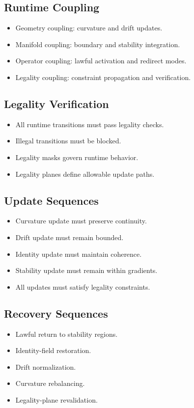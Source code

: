 \subsection{Runtime Coupling}
\begin{itemize}
    \item Geometry coupling: curvature and drift updates.
    \item Manifold coupling: boundary and stability integration.
    \item Operator coupling: lawful activation and redirect modes.
    \item Legality coupling: constraint propagation and verification.
\end{itemize}

\subsection{Legality Verification}
\begin{itemize}
    \item All runtime transitions must pass legality checks.
    \item Illegal transitions must be blocked.
    \item Legality masks govern runtime behavior.
    \item Legality planes define allowable update paths.
\end{itemize}

\subsection{Update Sequences}
\begin{itemize}
    \item Curvature update must preserve continuity.
    \item Drift update must remain bounded.
    \item Identity update must maintain coherence.
    \item Stability update must remain within gradients.
    \item All updates must satisfy legality constraints.
\end{itemize}

\subsection{Recovery Sequences}
\begin{itemize}
    \item Lawful return to stability regions.
    \item Identity-field restoration.
    \item Drift normalization.
    \item Curvature rebalancing.
    \item Legality-plane revalidation.
\end{itemize}

